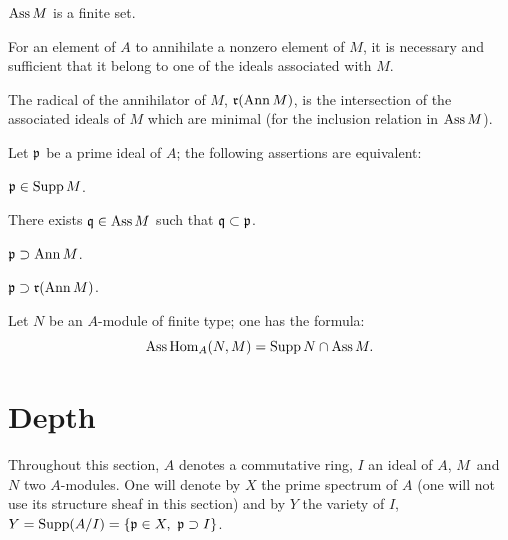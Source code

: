 \setcounter{subsection}{0}

\begin{proposition} \label{III.1.1}
\begin{enumeratei}
\item
\(\operatorname{Ass} M\) is a finite set.

\item
For an element of \(A\) to annihilate a nonzero element of \(M\), it is
necessary and sufficient that it belong to one of the ideals associated
with \(M\).

\item
The radical of the annihilator of \(M\), \(\mathfrak{r}(\operatorname{Ann} M)\), is the
intersection of the associated ideals of \(M\) which are minimal (for
the inclusion relation in \(\operatorname{Ass} M\)).
\end{enumeratei}
\end{proposition}

\begin{proposition} \label{III.1.2}
Let \(\mathfrak{p} \) be a prime ideal of \(A\); the following assertions are
equivalent:
\begin{enumeratei}
\item
\(\mathfrak{p} \in \operatorname{Supp} M\).

\item
There exists \(\mathfrak{q} \in \operatorname{Ass} M\) such that \(\mathfrak{q} \subset\mathfrak{p} \).

\item
\(\mathfrak{p} \supset \operatorname{Ann} M\).

\item[\textup{(iii bis)}]
\(\mathfrak{p} \supset \mathfrak{r}(\operatorname{Ann} M)\).
\end{enumeratei}
\end{proposition}

\begin{proposition} \label{III.1.3}
Let \(N\) be an \(A\)-module of finite type; one has the formula:
\[
\operatorname{Ass} \operatorname{Hom}_A(N, M) = \operatorname{Supp} N \cap \operatorname{Ass} M.
\]
\end{proposition}

\section{Depth} \label{III.2}

Throughout this section, \(A\) denotes a commutative ring, \(I\) an
ideal of \(A\), \(M\)~and~\(N\) two \(A\)-modules. One will denote by
\(X\) the prime spectrum of \(A\) (one will not use its structure sheaf
in this section) and by \(Y\) the variety of \(I\),
\(Y = \operatorname{Supp}(A/I) = \{\mathfrak{p} \in\nobreak X, \ \mathfrak{p} \supset I\}\).

